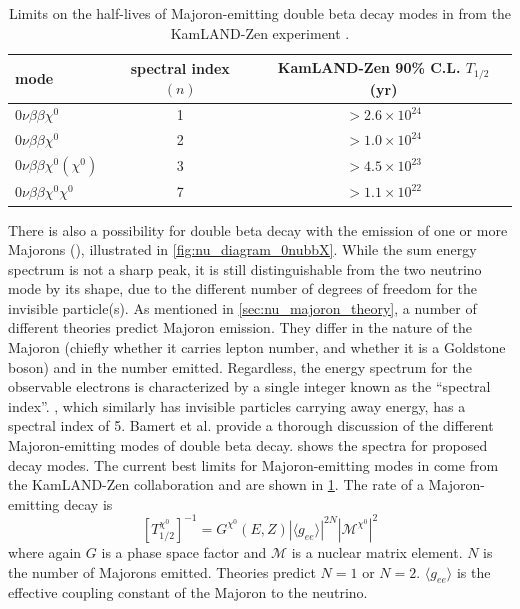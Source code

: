 \documentclass[herrin-thesis.tex]{subfiles}
\begin{document}
\begin{table}[hbp]
\centering
\caption[Current limits on \zeronuXpX{}]{Limits on the half-lives of Majoron-emitting double beta decay modes in  from the KamLAND-Zen experiment \cite{Gando:2012fk}.}
\label{tab:nu_majoron_limits}
\begin{tabular}{l c c}\toprule
	mode						&	spectral index \((n)\)		&	KamLAND-Zen 90\% C.L. \(T_{1/2}\) (yr)		\\\midrule
	\(0\nu\beta\beta\chi^{0}\)			&	1					&	\(>2.6\times10^{24}\)						\\
	\(0\nu\beta\beta\chi^{0}\)			&	2					&	\(>1.0\times10^{24}\)						\\
	\(0\nu\beta\beta\chi^{0}(\chi^{0})\)	&	3					&	\(>4.5\times10^{23}\)						\\
	\(0\nu\beta\beta\chi^{0}\chi^{0}\)	&	7					&	\(>1.1\times10^{22}\)						\\\bottomrule
\end{tabular}
\end{table}

There is also a possibility for double beta decay with the emission of one or more Majorons (\zeronuXpX{}), illustrated in \cref{fig:nu_diagram_0nubbX}. While the sum energy spectrum is not a sharp peak, it is still distinguishable from the two neutrino mode by its shape, due to the different number of degrees of freedom for the invisible particle(s). As mentioned in \cref{sec:nu_majoron_theory}, a number of different theories predict Majoron emission. They differ in the nature of the Majoron (chiefly whether it carries lepton number, and whether it is a Goldstone boson) and in the number emitted. Regardless, the energy spectrum for the observable electrons is characterized by a single integer known as the ``spectral index''. \twonu{}, which similarly has invisible particles carrying away energy, has a spectral index of 5. Bamert et al. \cite{Bamert:1995fk} provide a thorough discussion of the different Majoron-emitting modes of double beta decay.  shows the spectra for proposed decay modes. The current best limits for Majoron-emitting modes in  come from the KamLAND-Zen collaboration \cite{Gando:2012fk} and are shown in \cref{tab:nu_majoron_limits}. The rate of a Majoron-emitting decay is
\begin{equation}
\left [ T^{\chi^0}_{1/2} \right ]^{-1} = G^{\chi^{0}}\left(E, Z\right)\left | \langle g_{e e} \rangle \right |^{2N}\left | \mathcal{M}^{\chi^{0}}\right |^2
\label{eq:nu_majoron_rate}
\end{equation}
where again \(G\) is a phase space factor and \(\mathcal{M}\) is a nuclear matrix element. \(N\) is the number of Majorons emitted. Theories predict \(N=1\) or \(N=2\). \(\langle g_{e e} \rangle\) is the effective coupling constant of the Majoron to the neutrino.
\end{document}
